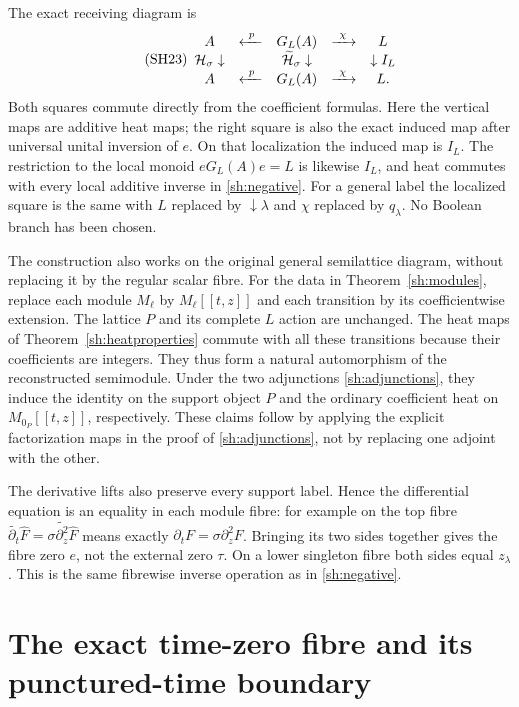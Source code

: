 The exact receiving diagram is
\begin{equation}\tag{SH23}\label{sh:heatmaps}
 \begin{array}{ccccc}
 A&\xleftarrow{\ p\ }&G_L(A)&\xrightarrow{\ \chi\ }&L\\
 \mathcal H_\sigma\downarrow&&
 \widetilde{\mathcal H}_\sigma\downarrow&&\downarrow I_L\\
 A&\xleftarrow{\ p\ }&G_L(A)&\xrightarrow{\ \chi\ }&L .
 \end{array}
\end{equation}
Both squares commute directly from the coefficient formulas.
Here the vertical maps are additive heat maps; the right square
is also the exact induced map after universal unital inversion
of $e$. On that localization the induced map is $I_L$.
The restriction to the local monoid $eG_L(A)e=L$ is likewise
$I_L$, and heat commutes with every local additive inverse in
\eqref{sh:negative}. For a general label the localized square is
the same with $L$ replaced by $\downarrow\lambda$ and
$\chi$ replaced by $q_\lambda$. No Boolean branch has been chosen.

The construction also works on the original general semilattice
diagram, without replacing it by the regular scalar fibre.
For the data in Theorem~\ref{sh:modules}, replace each module
$M_\ell$ by $M_\ell[[t,z]]$ and each transition by its
coefficientwise extension. The lattice $P$ and its complete
$L$ action are unchanged. The heat maps of
Theorem~\ref{sh:heatproperties} commute with all these
transitions because their coefficients are integers. They thus
form a natural automorphism of the reconstructed semimodule.
Under the two adjunctions \eqref{sh:adjunctions}, they induce
the identity on the support object $P$ and the ordinary
coefficient heat on $M_{0_P}[[t,z]]$, respectively.
These claims follow by applying the explicit factorization
maps in the proof of \eqref{sh:adjunctions}, not by replacing
one adjoint with the other.

The derivative lifts also preserve every support label. Hence
the differential equation is an equality in each module fibre:
for example on the top fibre
$\widetilde{\partial_t}\widehat F
 =\sigma\widetilde{\partial_z^2}\widehat F$
means exactly $\partial_tF=\sigma\partial_z^2F$.
Bringing its two sides together gives the fibre zero $e$,
not the external zero $\tau$. On a lower singleton fibre both
sides equal $z_\lambda$. This is the same fibrewise inverse
operation as in \eqref{sh:negative}.

\section{The exact time-zero fibre and its punctured-time boundary}


